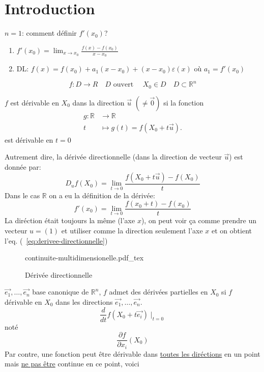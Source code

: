 \documentclass[a4paper]{report}
\newcommand\R{\ensuremath{\mathbb{R}}}
\let\epsilon\varepsilon
\theoremstyle{definition}
\newcommand{\incfig}[1]{%
    \def\svgwidth{\columnwidth}
    {#1.pdf_tex}
}
\begin{document}
\section{Introduction}
$n = 1$: comment définir  $f'(x_0)$?
\begin{enumerate}
    \item $f'(x_0) = \lim_{x \to x_0} \frac{f(x) - f(x_0)}{x - x_0}$
    \item DL: $f(x) = f(x_0) + a_1(x - x_0) + (x - x_0)\epsilon(x)$ où $a_1 = f'(x_0)$
\end{enumerate}

\[
f: D \to R \quad D \text{ ouvert } \quad X_0 \in D \quad D \subset \R^n
\] 

\begin{definition}
    $f$ est dérivable en  $X_0$ dans la direction $\vec{u}$ $(\neq \vec{0})$ si la fonction
    \begin{align*}
        g: \R &\longrightarrow \R \\
        t &\longmapsto g(t) = f(X_0 + t\vec{u})
    .\end{align*}
    est dérivable en $t = 0$
\end{definition}
Autrement dire, la dérivée directionnelle (dans la direction de vecteur $\vec{u}$) est donnée par:
\begin{equation}\label{eq:derivee-directionnelle}
    D_{u}f(X_0) = \lim_{t \to 0} \frac{f(X_0 + t\vec{u}) - f(X_0)}{t}
\end{equation}
Dans le cas $\R$ on a eu la définition de la dérivée:
\[
f'(x_0) = \lim_{t \to 0} \frac{f(x_0 + t) - f(x_0)}{t} 
\] 
La diréction était toujours la même (l'axe $x$), on peut voir ça comme prendre un vecteur $u = (1)$ et utiliser comme la direction seulement l'axe $x$ et on obtient  l'eq. (~\ref{eq:derivee-directionnelle})
\begin{figure}[H]
    \centering
    \incfig{continuite-multidimensionelle}
    \caption{Dérivée directionnelle}
    \label{fig:continuite-multidimensionelle}
\end{figure}
$\vec{e_1}, \ldots, \vec{e_n}$ base canonique de $\R^n$, $f$ admet des dérivées partielles en  $X_0$ si $f$ dérivable en  $X_0$ dans les directions $\vec{e_1}, \ldots, \vec{e_n}$.
\[
    \frac{d}{dt} f(X_0 + t \vec{e_i}) \mid_{t = 0}
\] 
noté
\[
\frac{\partial f}{\partial x_i}(X_0)
\] 
Par contre, une fonction peut être dérivable dans \underline{toutes les diréctions} en un point mais \underline{ne pas être} continue en ce point, voici 
\end{document}
